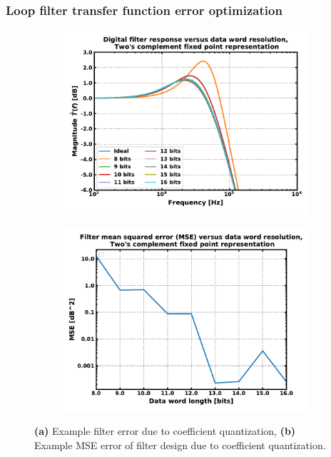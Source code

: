 \subsubsection{Loop filter transfer function error optimization}
\begin{figure}[htb!]
    \centering
    \begin{subfigure}{0.5\textwidth}
        \centering
        \includegraphics[width=1\textwidth, angle=0]{figs/tf_quant_error.pdf}
        \caption{ }
        \label{fig:tf_curves_quant_error}
    \end{subfigure}%
    \begin{subfigure}{0.5\textwidth}
        \centering
        \includegraphics[width=1\textwidth, angle=0]{figs/tf_mse.pdf}
        \caption{ }
        \label{fig:tf_mse}
    \end{subfigure}
    \label{fig:tf_quant_error}
    \caption{\textbf{(a)} Example filter error due to coefficient quantization, \textbf{(b)} Example MSE error of filter design due to coefficient quantization.}
\end{figure}